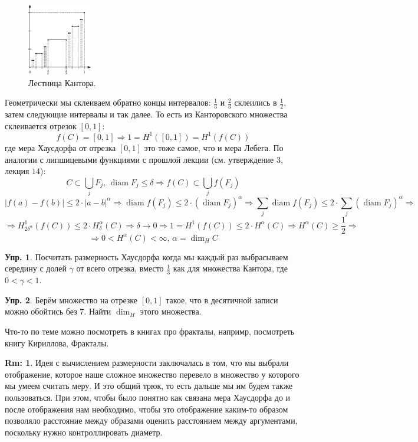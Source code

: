 \documentclass[12pt]{article}
\theoremstyle{definition}
\newtheorem{rem}{Rm:}
\newtheorem{exrc}{Упр.}
\DeclareMathOperator{\diam}{\text{diam}}
\newcommand{\ddsum}[2]{\displaystyle\sum\limits_{#1}^{#2}}
\begin{document}
\begin{figure}[H]
	\centering
	\includegraphics[width=0.25\textwidth]{MA4L15_3.eps}
	\caption{Лестница Кантора.}
	\label{15_3}
\end{figure}
Геометрически мы склеиваем обратно концы интервалов: $\tfrac{1}{3}$ и $\tfrac{2}{3}$ склеились в $\tfrac{1}{2}$, затем следующие интервалы и так далее. То есть из Канторовского множества склеивается отрезок $[0,1]$:
$$
	f(C) = [0,1] \Rightarrow 1 = H^1([0,1]) = H^1(f(C))
$$
где мера Хаусдорфа от отрезка $[0,1]$ это тоже самое, что и мера Лебега. По аналогии с липшицевыми функциями с прошлой лекции (см. утверждение $3$, лекция $14$):
$$
	C \subset \bigcup\limits_j F_j, \, \diam{F_j} \leq \delta \Rightarrow f(C) \subset \bigcup\limits_j f(F_j) 
$$
$$	
	|f(a) - f(b)| \leq 2{\cdot}|a - b|^\alpha \Rightarrow \diam{f(F_j)} \leq 2{\cdot}\left(\diam{F_j}\right)^\alpha \Rightarrow\ddsum{j}{}\diam{f(F_j)} \leq 2{\cdot}\ddsum{j}{}\left(\diam{F_j}\right)^\alpha \Rightarrow 
$$
$$	
	\Rightarrow H^1_{2\delta^\alpha}(f(C)) \leq 2{\cdot}H_\delta^\alpha(C) \Rightarrow \delta \to 0 \Rightarrow 1 = H^1(f(C)) \leq 2{\cdot}H^\alpha(C) \Rightarrow H^\alpha(C) \geq \dfrac{1}{2} \Rightarrow
$$
$$
	\Rightarrow 0 < H^\alpha(C) < \infty, \, \alpha = \dim_H{C}
$$
\begin{exrc}
	Посчитать размерность Хаусдорфа когда мы каждый раз выбрасываем середину с долей $\gamma$ от всего отрезка, вместо $\tfrac{1}{3}$ как для множества Кантора, где $0 < \gamma < 1$.
\end{exrc}
\begin{exrc}
	Берём множество на отрезке $[0,1]$ такое, что в десятичной записи можно обойтись без $7$. Найти $\dim_H$ этого множества.
\end{exrc}
Что-то по теме можно посмотреть в книгах про фракталы, напримр, посмотреть книгу Кириллова, Фракталы.

\begin{rem}
	Идея с вычислением размерности заключалась в том, что мы выбрали отображение, которое наше сложное множество перевело в множество у которого мы умеем считать меру. И это общий трюк, то есть дальше мы им будем также пользоваться. При этом, чтобы было понятно как связана мера Хаусдорфа до и после отображения нам необходимо, чтобы это отображение каким-то образом позволяло расстояние между образами оценить расстоянием между аргументами, поскольку нужно контроллировать диаметр.
\end{rem}
\end{document}
